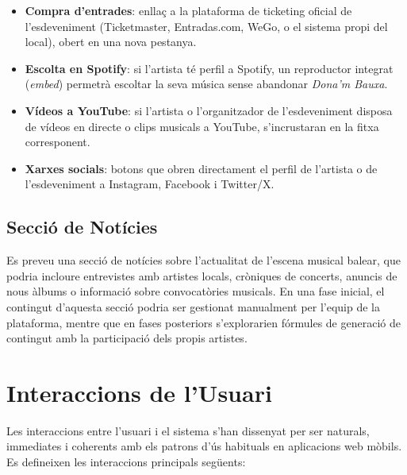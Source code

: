 \begin{itemize}
    \item \textbf{Compra d'entrades}: enllaç a la plataforma de ticketing oficial de l'esdeveniment (Ticketmaster, Entradas.com, WeGo, o el sistema propi del local), obert en una nova pestanya.
    \item \textbf{Escolta en Spotify}: si l'artista té perfil a Spotify, un reproductor integrat (\textit{embed}) permetrà escoltar la seva música sense abandonar \textit{Dona'm Bauxa}.
    \item \textbf{Vídeos a YouTube}: si l'artista o l'organitzador de l'esdeveniment disposa de vídeos en directe o clips musicals a YouTube, s'incrustaran en la fitxa corresponent.
    \item \textbf{Xarxes socials}: botons que obren directament el perfil de l'artista o de l'esdeveniment a Instagram, Facebook i Twitter/X.
\end{itemize}

\subsection{Secció de Notícies}

Es preveu una secció de notícies sobre l'actualitat de l'escena musical balear, que podria incloure entrevistes amb artistes locals, cròniques de concerts, anuncis de nous àlbums o informació sobre convocatòries musicals. En una fase inicial, el contingut d'aquesta secció podria ser gestionat manualment per l'equip de la plataforma, mentre que en fases posteriors s'explorarien fórmules de generació de contingut amb la participació dels propis artistes.

\section{Interaccions de l'Usuari}

Les interaccions entre l'usuari i el sistema s'han dissenyat per ser naturals, immediates i coherents amb els patrons d'ús habituals en aplicacions web mòbils. Es defineixen les interaccions principals següents:

